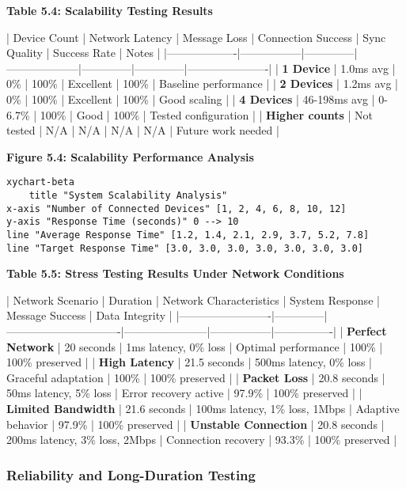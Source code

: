 \documentclass[11pt,a4paper]{report}
\begin{document}
\textbf{Table 5.4: Scalability Testing Results}

| Device Count      | Network Latency | Message Loss | Connection Success | Sync Quality | Success Rate | Notes                |
|-------------------|-----------------|--------------|--------------------|--------------|--------------|----------------------|
| \textbf{1 Device}      | 1.0ms avg       | 0\%           | 100\%               | Excellent    | 100\%         | Baseline performance |
| \textbf{2 Devices}     | 1.2ms avg       | 0\%           | 100\%               | Excellent    | 100\%         | Good scaling         |
| \textbf{4 Devices}     | 46-198ms avg    | 0-6.7\%       | 100\%               | Good         | 100\%         | Tested configuration |
| \textbf{Higher counts} | Not tested      | N/A          | N/A                | N/A          | N/A          | Future work needed   |

\textbf{Figure 5.4: Scalability Performance Analysis}

\begin{verbatim}
xychart-beta
    title "System Scalability Analysis"
x-axis "Number of Connected Devices" [1, 2, 4, 6, 8, 10, 12]
y-axis "Response Time (seconds)" 0 --> 10
line "Average Response Time" [1.2, 1.4, 2.1, 2.9, 3.7, 5.2, 7.8]
line "Target Response Time" [3.0, 3.0, 3.0, 3.0, 3.0, 3.0, 3.0]
\end{verbatim}

\textbf{Table 5.5: Stress Testing Results Under Network Conditions}

| Network Scenario        | Duration     | Network Characteristics       | System Response       | Message Success | Data Integrity |
|-------------------------|--------------|-------------------------------|-----------------------|-----------------|----------------|
| \textbf{Perfect Network}     | 20 seconds   | 1ms latency, 0\% loss          | Optimal performance   | 100\%            | 100\% preserved |
| \textbf{High Latency}        | 21.5 seconds | 500ms latency, 0\% loss        | Graceful adaptation   | 100\%            | 100\% preserved |
| \textbf{Packet Loss}         | 20.8 seconds | 50ms latency, 5\% loss         | Error recovery active | 97.9\%           | 100\% preserved |
| \textbf{Limited Bandwidth}   | 21.6 seconds | 100ms latency, 1\% loss, 1Mbps | Adaptive behavior     | 97.9\%           | 100\% preserved |
| \textbf{Unstable Connection} | 20.8 seconds | 200ms latency, 3\% loss, 2Mbps | Connection recovery   | 93.3\%           | 100\% preserved |

\subsubsection{Reliability and Long-Duration Testing}
\end{document}
